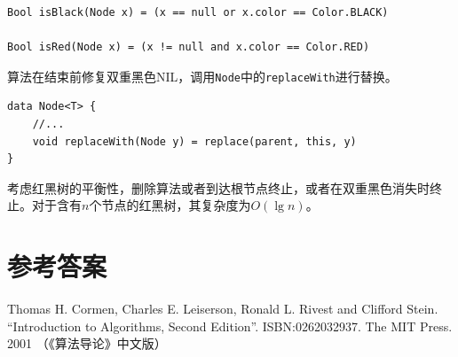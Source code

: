 \documentclass[b5paper]{ctexart}
\begin{document}
\begin{lstlisting}[language = Bourbaki]
Bool isBlack(Node x) = (x == null or x.color == Color.BLACK)

Bool isRed(Node x) = (x != null and x.color == Color.RED)
\end{lstlisting}

算法在结束前修复双重黑色NIL，调用\texttt{Node}中的\texttt{replaceWith}进行替换。

\begin{lstlisting}[language = Bourbaki]
data Node<T> {
    //...
    void replaceWith(Node y) = replace(parent, this, y)
}
\end{lstlisting}

考虑红黑树的平衡性，删除算法或者到达根节点终止，或者在双重黑色消失时终止。对于含有$n$个节点的红黑树，其复杂度为$O(\lg n)$。

\begin{Exercise}
\end{Exercise}

\ifx\wholebook\relax \else
\section{参考答案}
\shipoutAnswer

\begin{thebibliography}{99}

Thomas H. Cormen, Charles E. Leiserson, Ronald L. Rivest and Clifford Stein.
``Introduction to Algorithms, Second Edition''. ISBN:0262032937. The MIT Press. 2001 （《算法导论》中文版）

\end{thebibliography}

\expandafter\enddocument
\fi
\end{document}
